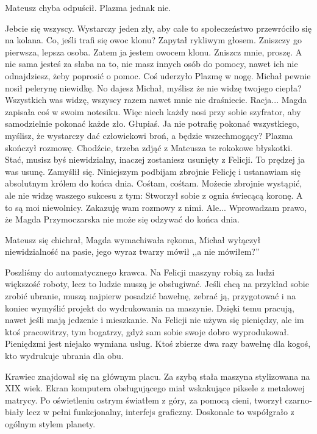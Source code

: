 Mateusz chyba odpuścił. Plazma jednak nie.
\begin{dialogue}
\ds{} Jebcie się wszyscy. Wystarczy jeden zły, aby całe to społeczeństwo przewróciło się na kolana. Co, jeśli trafi się owoc klonu? \dm{} Zapytał rykliwym głosem.
\ds{} Zniszczy go pierwsza, lepsza osoba.
\ds{} Zatem ja jestem owocem klonu. Zniszcz mnie, proszę. A nie sama jesteś za słaba na to, nie masz innych osób do pomocy, nawet ich nie odnajdziesz, żeby poprosić o pomoc. \dm{}
Coś uderzyło Plazmę w nogę. Michał pewnie nosił pelerynę niewidkę. \dm{} No dajesz Michał, myślisz że nie widzę twojego ciepła? Wszystkich was widzę, wszyscy razem nawet mnie nie draśniecie. 
\ds{} Racja... \dm{} Magda zapisała coś w swoim notesiku. \dm{} Więc niech każdy nosi przy sobie szyfrator, aby samodzielnie pokonać każde zło.
\ds{} Głupiaś. Ja nie potrafię pokonać wszystkiego, myślisz, że wystarczy dać człowiekowi broń, a będzie wszechmogący? \dm{} Plazma skończył rozmowę. \dm{} Chodźcie, trzeba zdjąć z Mateusza 
te rokokowe błyskotki.
\ds{} Stać, musisz byś niewidzialny, inaczej zostaniesz usunięty z Felicji.
\ds{} To prędzej ja was usunę. \dm{} Zamyślił się. \dm{} Niniejszym podbijam zbrojnie Felicję i ustanawiam się absolutnym królem do końca dnia. Cośtam, cośtam. 
Możecie zbrojnie wystąpić, ale nie widzę waszego sukcesu z tym: \dm{} Stworzył sobie z ognia świecącą koronę. \dm{} A to są moi niewolnicy. Zakazuję wam rozmowy z nimi.
\ds{} Ale...
\ds{} Wprowadzam prawo, że Magda Przymoczarska nie może się odzywać do końca dnia. \dm{}
\end{dialogue}

Mateusz się chichrał, Magda wymachiwała rękoma, Michał wyłączył niewidzialność na pasie, jego wyraz twarzy mówił ,,a nie mówiłem?''

Poszliśmy do automatycznego krawca.
Na Felicji maszyny robią za ludzi większość roboty, lecz to ludzie muszą je obsługiwać. 
Jeśli chcą na przykład sobie zrobić ubranie, muszą najpierw posadzić bawełnę, zebrać ją, przygotować i na koniec wymyślić projekt do wydrukowania na maszynie.
Dzięki temu pracują, nawet jeśli mają jedzenie i mieszkanie. 
Na Felicji nie używa się pieniędzy, ale im ktoś pracowitrzy, tym bogatrzy, gdyż sam sobie swoje dobro wyprodukował.
Pieniędzmi jest niejako wymiana usług. Ktoś zbierze dwa razy bawełnę dla kogoś, kto wydrukuje ubrania dla obu.

Krawiec znajdował się na głównym placu.
Za szybą stała maszyna stylizowana na XIX wiek. 
Ekran komputera obsługującego miał wskakujące piksele z metalowej matrycy. 
Po oświetleniu ostrym światłem z góry, za pomocą cieni, tworzył czarno-biały lecz w pełni funkcjonalny, interfejs graficzny.
Doskonale to współgrało z ogólnym stylem planety.

